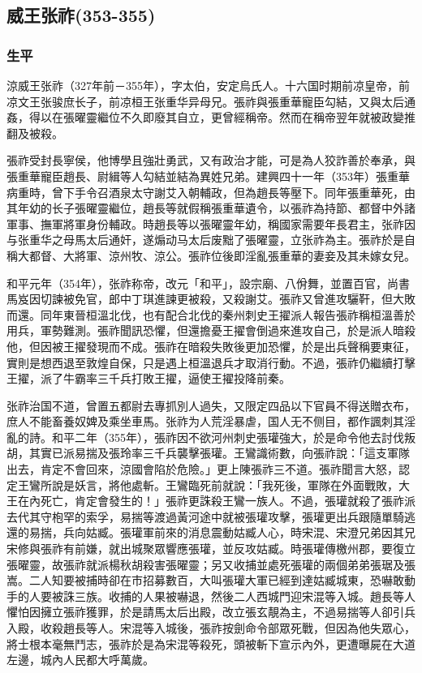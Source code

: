 
\subsection{威王张祚\tiny(353-355)}

\subsubsection{生平}

涼威王张祚（327年前－355年），字太伯，安定烏氏人。十六国时期前凉皇帝，前凉文王张骏庶长子，前凉桓王张重华异母兄。張祚與張重華寵臣勾結，又與太后通姦，得以在張曜靈繼位不久即廢其自立，更曾經稱帝。然而在稱帝翌年就被政變推翻及被殺。

張祚受封長寧侯，他博學且強壯勇武，又有政治才能，可是為人狡詐善於奉承，與張重華寵臣趙長、尉緝等人勾結並結為異姓兄弟。建興四十一年（353年）張重華病重時，曾下手令召酒泉太守謝艾入朝輔政，但為趙長等壓下。同年張重華死，由其年幼的长子張曜靈繼位，趙長等就假稱張重華遺令，以張祚為持節、都督中外諸軍事、撫軍將軍身份輔政。時趙長等以張曜靈年幼，稱國家需要年長君主，张祚因与张重华之母馬太后通奸，遂煽动马太后废黜了張曜靈，立张祚為主。張祚於是自稱大都督、大將軍、涼州牧、涼公。張祚位後即淫亂張重華的妻妾及其未嫁女兒。

和平元年（354年），张祚称帝，改元「和平」，設宗廟、八佾舞，並置百官，尚書馬岌因切諫被免官，郎中丁琪進諫更被殺，又殺謝艾。張祚又曾進攻驪靬，但大敗而還。同年東晉桓溫北伐，也有配合北伐的秦州刺史王擢派人報告張祚稱桓溫善於用兵，軍勢難測。張祚聞訊恐懼，但還擔憂王擢會倒過來進攻自己，於是派人暗殺他，但因被王擢發現而不成。張祚在暗殺失敗後更加恐懼，於是出兵聲稱要東征，實則是想西退至敦煌自保，只是遇上桓溫退兵才取消行動。不過，張祚仍繼續打擊王擢，派了牛霸率三千兵打敗王擢，逼使王擢投降前秦。

张祚治国不道，曾置五都尉去專抓別人過失，又限定四品以下官員不得送贈衣布，庶人不能畜養奴婢及乘坐車馬。张祚为人荒淫暴虐，国人无不侧目，都作諷刺其淫亂的詩。和平二年（355年），張祚因不欲河州刺史張瓘強大，於是命令他去討伐叛胡，其實已派易揣及張玲率三千兵襲擊張瓘。王鸞識術數，向張祚說：「這支軍隊出去，肯定不會回來，涼國會陷於危險。」更上陳張祚三不道。張祚聞言大怒，認定王鸞所說是妖言，將他處斬。王鸞臨死前就說：「我死後，軍隊在外面戰敗，大王在內死亡，肯定會發生的！」張祚更誅殺王鸞一族人。不過，張瓘就殺了張祚派去代其守枹罕的索孚，易揣等渡過黃河途中就被張瓘攻擊，張瓘更出兵跟隨單騎逃還的易揣，兵向姑臧。張瓘軍前來的消息震動姑臧人心，時宋混、宋澄兄弟因其兄宋修與張祚有前嫌，就出城聚眾響應張瓘，並反攻姑臧。時張瓘傳檄州郡，要復立張曜靈，故張祚就派楊秋胡殺害張曜靈；另又收捕並處死張瓘的兩個弟弟張琚及張嵩。二人知要被捕時卻在市招募數百，大叫張瓘大軍已經到達姑臧城東，恐嚇敢動手的人要被誅三族。收捕的人果被嚇退，然後二人西城門迎宋混等入城。趙長等人懼怕因擁立張祚獲罪，於是請馬太后出殿，改立張玄靚為主，不過易揣等人卻引兵入殿，收殺趙長等人。宋混等入城後，張祚按劍命令部眾死戰，但因為他失眾心，將士根本毫無鬥志，張祚於是為宋混等殺死，頭被斬下宣示內外，更遭曝屍在大道左邊，城內人民都大呼萬歲。

